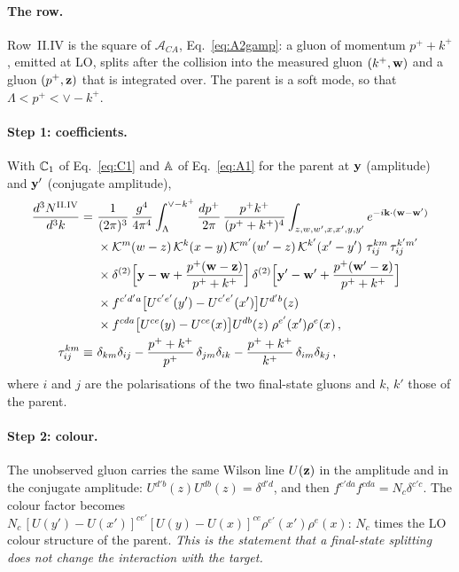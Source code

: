 \paragraph{The row.} Row~II.IV is the square of $\mathcal A_{CA}$, Eq.~\eqref{eq:A2gamp}: a gluon of momentum $p^++k^+$, emitted at LO, splits after the collision into the measured gluon $(k^+,\mathbf{w})$ and a gluon $(p^+,\mathbf{z})$ that is integrated over. The parent is a soft mode, so that $\Lambda<p^+<\vee-k^+$.

\paragraph{Step 1: coefficients.} With $\mathbb{C}_1$ of Eq.~\eqref{eq:C1} and $\mathbb{A}$ of Eq.~\eqref{eq:A1} for the parent at $\mathbf{y}$ (amplitude) and $\mathbf{y}'$ (conjugate amplitude),
\begin{align}\label{eq:ex2_start}
\frac{d^3N^{\rm II.IV}}{d^3k}=\ &\frac{1}{(2\pi)^3}\,\frac{g^4}{4\pi^4}\int_\Lambda^{\vee-k^+}\frac{dp^+}{2\pi}\,\frac{p^+k^+}{(p^++k^+)^4}\int_{z,w,w',x,x',y,y'}e^{-i\v k\cdot(\v w-\v w')}\notag\\
&\times\Kv^m(w-z)\,\Kv^k(x-y)\,\Kv^{m'}(w'-z)\,\Kv^{k'}(x'-y')\,\,\tau^{km}_{ij}\,\tau^{k'm'}_{ij}\notag\\
&\times\delta^{(2)}\Big[\v y-\v w+\frac{p^+(\v w-\v z)}{p^++k^+}\Big]\,\delta^{(2)}\Big[\v y'-\v w'+\frac{p^+(\v w'-\v z)}{p^++k^+}\Big]\notag\\
&\times f^{c'd'a}\big[U^{c'e'}(y')-U^{c'e'}(x')\big]U^{d'b}(z)\notag\\
&\times f^{cda}\big[U^{ce}(y)-U^{ce}(x)\big]U^{db}(z)\;\rho^{e'}(x')\rho^e(x)\,,\notag\\
\tau^{km}_{ij}\equiv\ &\delta_{km}\delta_{ij}-\frac{p^++k^+}{p^+}\,\delta_{jm}\delta_{ik}-\frac{p^++k^+}{k^+}\,\delta_{im}\delta_{kj}\,,
\end{align}
where $i$ and $j$ are the polarisations of the two final-state gluons and $k$, $k'$ those of the parent.

\paragraph{Step 2: colour.} The unobserved gluon carries the same Wilson line $U(\mathbf{z})$ in the amplitude and in the conjugate amplitude: $U^{d'b}(z)U^{db}(z)=\delta^{d'd}$, and then $f^{c'da}f^{cda}=N_c\delta^{c'c}$. The colour factor becomes $N_c\,[U(y')-U(x')]^{ce'}[U(y)-U(x)]^{ce}\rho^{e'}(x')\rho^e(x)$: $N_c$ times the LO colour structure of the parent. \emph{This is the statement that a final-state splitting does not change the interaction with the target.}


